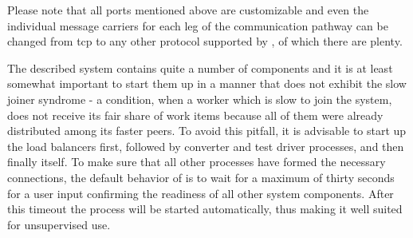 Please note that all ports mentioned above are customizable and even the individual message carriers for
each leg of the communication pathway can be changed from tcp to any other protocol supported by \zmq, of which
there are plenty.


The described system contains quite a number of components and it is at least somewhat important to start them
up in a manner that does not exhibit the slow joiner syndrome - a condition, when a worker which is slow to
join the system, does not receive its fair share of work items because all of them were already distributed
among its faster peers. To avoid this pitfall, it is advisable to start up the load balancers first, followed
by converter and test driver processes, and then finally \xmlmate itself. To make sure that all other
processes have formed the necessary connections, the default behavior of \xmlmate is to wait for a maximum of
thirty seconds for a user input confirming the readiness of all other system components. After this timeout the
process will be started automatically, thus making it well suited for unsupervised use.

